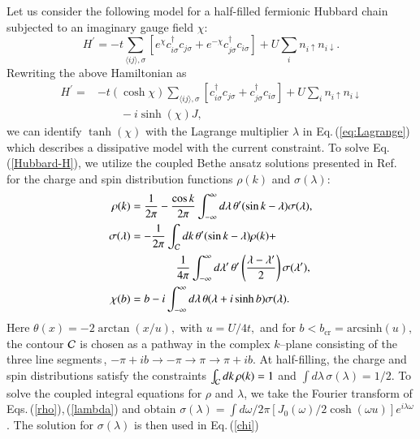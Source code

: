 \documentclass[aps,twocolumn,prl,10pt,amsmath,amssymb,nofootinbib,showpacs,superscriptaddress,floatfix]{revtex4-1}
\begin{document}
Let us consider the following model for a half-filled fermionic Hubbard chain
subjected to an imaginary gauge field $\chi$: 
\begin{equation}
H^{\prime}=-t\sum_{\langle ij\rangle,\sigma}[e^{\chi}c_{i\sigma}^{\dagger}c_{j\sigma}+e^{-\chi}c_{j\sigma}^{\dagger}c_{i\sigma}]+U\sum_{i}n_{i\uparrow}n_{i\downarrow}.\label{Hubbard-H}
\end{equation}
Rewriting the above Hamiltonian as
\begin{align}
	H^{\prime}= & -t(\cosh\chi)\sum_{\langle ij\rangle,\sigma}[c_{i\sigma}^{\dagger}c_{j\sigma}+c_{j\sigma}^{\dagger}c_{i\sigma}]+U\sum_{i}n_{i\uparrow}n_{i\downarrow}\nonumber \\
	& \qquad-i\sinh(\chi)J,\label{eq:Hubbard-H2}
\end{align}
we can identify $\tanh(\chi)$ with the Lagrange multiplier $\lambda$
in Eq.\,(\ref{eq:Lagrange}) which describes a dissipative model with
the current constraint. To solve Eq.\,(\ref{Hubbard-H}), we utilize
the coupled Bethe ansatz solutions presented in Ref.\,\cite{fukui}
for the charge and spin distribution functions $\rho(k)$ and $\sigma(\lambda)$:
\begin{align}
	\rho(k) & =\frac{1}{2\pi}-\frac{\cos k}{2\pi}\int_{-\infty}^{\infty}d\lambda\,\theta'(\sin k-\lambda)\sigma(\lambda),\label{rho}\\
	\sigma(\lambda) & =-\frac{1}{2\pi}\int_{{\cal C}}dk\,\theta'(\sin k-\lambda)\rho(k)+\nonumber \\
	& \qquad\qquad\frac{1}{4\pi}\int_{-\infty}^{\infty}d\lambda'\,\theta'\left(\frac{\lambda-\lambda'}{2}\right)\sigma(\lambda'),\label{lambda}\\
	\chi(b) & =b-i\int_{-\infty}^{\infty}d\lambda\,\theta(\lambda+i\sinh b)\sigma(\lambda).\label{chi}
\end{align}
Here $\theta(x)=-2\arctan(x/u),$ with $u=U/4t,$ and for $b<b_{\text{cr}}=\mbox{arcsinh}(u),$
the contour ${\cal C}$ is chosen as a pathway in the complex $k$--plane
consisting of the three line segments\,\cite{fukui}, $-\pi+ib\rightarrow-\pi\rightarrow\pi\rightarrow\pi+ib$.
At half-filling, the charge and spin distributions satisfy the constraints
$\int_{{\cal C}}dk\,\rho(k)=1$ and $\int d\lambda\,\sigma(\lambda)=1/2$.
To solve the coupled integral equations for $\rho$ and $\lambda$,
we take the Fourier transform of Eqs.\,(\ref{rho}),\,(\ref{lambda}) and
obtain $\sigma(\lambda)=\int d\omega/2\pi[J_{0}(\omega)/2\cosh(\omega u)]e^{i\lambda\omega}$.
The solution for $\sigma(\lambda)$ is then used in Eq.\,(\ref{chi})
\end{document}
